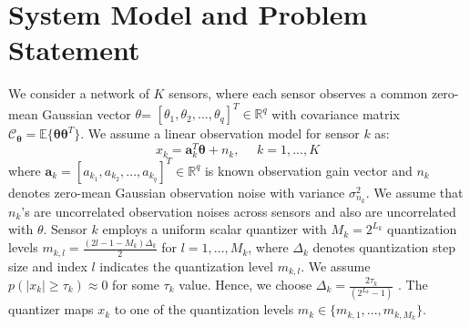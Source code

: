 \documentclass[conference]{IEEEtran}
\begin{document}
\section{System Model and Problem Statement} \label{System Model}
We consider a network of $K$ sensors,
where each sensor observes a common zero-mean Gaussian vector {\boldmath$\theta$}= $[\theta_1, \theta_2,..., \theta_q]^T\!\in\!\mathbb{R}^q$ with covariance matrix $\boldsymbol{\mathcal C}_{\boldsymbol{\theta}}=\mathbb{E}\{\boldsymbol{\theta}\boldsymbol{\theta}^T\}$. 
We assume a linear observation model for sensor $k$ as:
%
\begin{equation} \label{obs_model}
x_k=\mathbf{a}_k^T \boldsymbol{\theta}+n_k, \ \ \ \ \ \ k=1,..., K
\end{equation}
%
where $\mathbf{a}_k\!=\![a_{k_1}, a_{k_2},..., a_{k_q}]^T\!\in\!\mathbb{R}^q$ is known observation gain vector and $n_k$ denotes zero-mean Gaussian observation noise with variance $\sigma_{n_k}^2$. We assume that $n_k$'s are uncorrelated observation noises across sensors and also are uncorrelated with {\boldmath$\theta$}. Sensor $k$ employs a uniform scalar quantizer with $M_k\!=\!2^{L_k}$ quantization levels $m_{k,l}\!=\!\frac{(2l-1-M_k)\Delta_k}{2}$ for $l\!=\!1,...,M_k$, where $\Delta_k$ denotes quantization step size and index $l$ indicates the quantization level $m_{k,l}$. We assume $p(|x_k|\!\geq\!\tau_k)\! \approx \! 0$ for some $\tau_k$ value. Hence, we choose ${\Delta_k} \!= \! \frac{2\tau_k}{(2^{L_k}-1)}$  \cite{Vandendorpe_2012,Vosoughi_Sani_2016}. The quantizer maps $x_k$ to one of the quantization levels $m_k \in \{m_{k,1},...,m_{k,M_k}\}$. 
%
\end{document}
